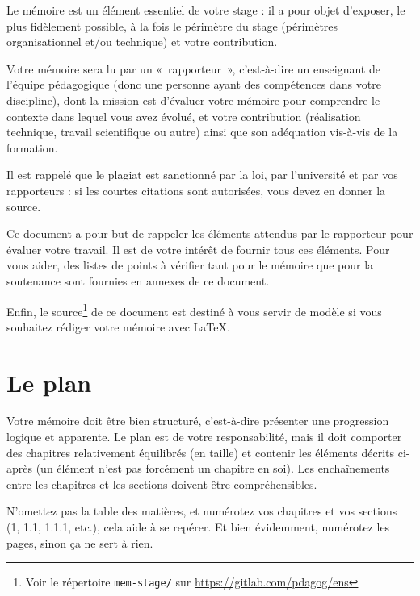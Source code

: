 \documentclass [twoside,openright,a4paper,11pt,french] {report}
\begin{document}
Le mémoire est un élément essentiel de votre stage : il a pour objet
d'exposer, le plus fidèlement possible, à la fois le périmètre du
stage (périmètres organisationnel et/ou technique) et votre contribution.

Votre mémoire sera lu par un «~rapporteur~», c'est-à-dire un
enseignant de l'équipe pédagogique (donc une personne ayant des
compétences dans votre discipline), dont la mission est d'évaluer votre
mémoire pour comprendre le contexte dans lequel vous avez évolué,
et votre contribution (réalisation technique, travail scientifique ou
autre) ainsi que son adéquation vis-à-vis de la formation.

Il est rappelé que le plagiat est sanctionné par la loi, par
l'université et par vos rapporteurs : si les courtes citations sont
autorisées, vous devez en donner la source.

Ce document a pour but de rappeler les éléments attendus par le
rapporteur pour évaluer votre travail. Il est de votre intérêt de
fournir tous ces éléments. Pour vous aider, des listes de points
à vérifier tant pour le mémoire que pour la soutenance sont
fournies en annexes de ce document.

Enfin, le source\footnote{Voir le répertoire \texttt{mem-stage/} sur
\url{https://gitlab.com/pdagog/ens}} de ce document est destiné à vous
servir de modèle si vous souhaitez rédiger votre mémoire avec \LaTeX.


\chapter {Le plan}
    \label {chap:plan}

Votre mémoire doit être bien structuré, c'est-à-dire présenter une
progression logique et apparente. Le plan est de votre responsabilité,
mais il doit comporter des chapitres relativement équilibrés (en taille)
et contenir les éléments décrits ci-après (un élément n'est pas
forcément un chapitre en soi). Les enchaînements entre les chapitres
et les sections doivent être compréhensibles.

N'omettez pas la table des matières, et numérotez vos chapitres et
vos sections (1, 1.1, 1.1.1, etc.), cela aide à se repérer. Et bien
évidemment, numérotez les pages, sinon ça ne sert à rien.
\end{document}
